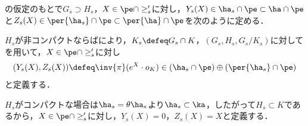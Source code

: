 \begin{defi}

  の仮定のもとで$G_s\supset H_s$，$X\in \pe\cap\ge_{s}' $に対し，$Y_s(X)\in \ha_s\cap\pe \subset \ha\cap \pe $と$Z_s(X)\in \per{\ha_s}\cap \pe \subset \per{\ha}\cap \pe $を次のように定める．
  
  $H_s $が非コンパクトならばにより，$K_s\defeq G_s\cap K $，$(G_s, H_s, G_s/K_s) $に対してを用いて，$X\in \pe\cap\ge_{s}' $に対し
  \begin{align*}
    {(Y_s(X), Z_s(X))\defeq \inv{\pi}(e^X\cdot o_K)\in (\ha_s\cap\pe)\oplus (\per{\ha_s}\cap \pe)}
  \end{align*}
  と定義する．


  $H_s $がコンパクトな場合は$\ha_s = \theta \ha_s$より$\ha_s\subset \ka $，したがって$H_s\subset K $であるから，$X\in \pe\cap\ge_{s}' $に対し，$Y_s(X) = 0 $，$Z_s(X) = X $と定義する．
\end{defi}

